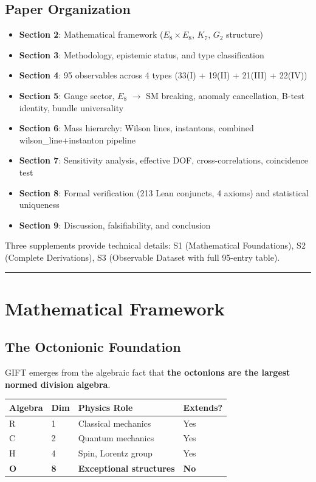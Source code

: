 \documentclass[11pt,a4paper]{article}
\begin{document}
\subsection{Paper Organization}

\begin{itemize}

\item
  \textbf{Section 2}: Mathematical framework (\(E_{8} \times E_{8}\),
  \(K_{7}\), \(G_{2}\) structure)
\item
  \textbf{Section 3}: Methodology, epistemic status, and type
  classification
\item
  \textbf{Section 4}: 95 observables across 4 types (33(I) + 19(II) +
  21(III) + 22(IV))
\item
  \textbf{Section 5}: Gauge sector, \(E_{8}\) \(\to\) SM breaking,
  anomaly cancellation, B-test identity, bundle universality
\item
  \textbf{Section 6}: Mass hierarchy: Wilson lines, instantons,
  combined wilson\_line+instanton pipeline
\item
  \textbf{Section 7}: Sensitivity analysis, effective DOF,
  cross-correlations, coincidence test
\item
  \textbf{Section 8}: Formal verification (213 Lean conjuncts, 4 axioms)
  and statistical uniqueness
\item
  \textbf{Section 9}: Discussion, falsifiability, and conclusion
\end{itemize}

Three supplements provide technical details: S1 (Mathematical
Foundations), S2 (Complete Derivations), S3 (Observable Dataset with
full 95-entry table).

\noindent

\rule{\textwidth}{0.2pt}

\section{Mathematical Framework}

\subsection{The Octonionic Foundation}

GIFT emerges from the algebraic fact that \textbf{the octonions are the
largest normed division algebra}.

\begin{longtable}[]{@{}llll@{}}
\toprule\noalign{}
Algebra & Dim & Physics Role & Extends? \\
\midrule\noalign{}
\endhead
\bottomrule\noalign{}
\endlastfoot
R & 1 & Classical mechanics & Yes \\
C & 2 & Quantum mechanics & Yes \\
H & 4 & Spin, Lorentz group & Yes \\
\textbf{O} & \textbf{8} & \textbf{Exceptional structures} &
\textbf{No} \\
\end{longtable}
\end{document}
